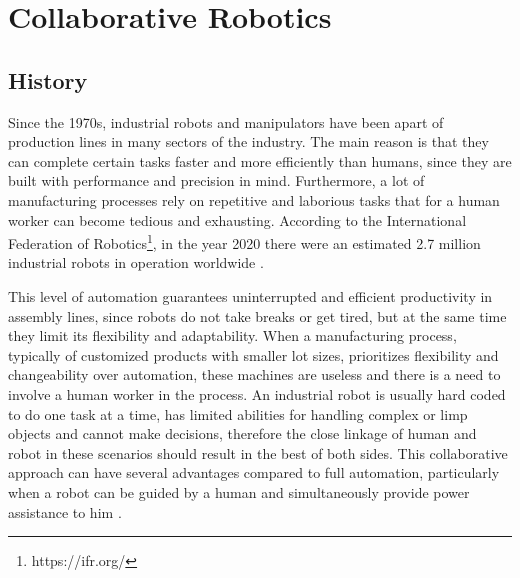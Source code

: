 \chapter{Collaborative Robotics}
\label{chapter:state-of-art}


\section{History}


\par Since the 1970s, industrial robots and manipulators have been apart of production lines in many sectors of the industry. The main reason is that they can complete certain tasks faster and more efficiently than humans, since they are built with performance and precision in mind. Furthermore, a lot of manufacturing processes rely on repetitive and laborious tasks that for a human worker can become tedious and exhausting. According to the International Federation of Robotics\footnote{https://ifr.org/}, in the year 2020 there were an estimated 2.7 million industrial robots in operation worldwide \cite{wr.report.2020}.

\par This level of automation guarantees uninterrupted and efficient productivity in assembly lines, since robots do not take breaks or get tired, but at the same time they limit its flexibility and adaptability. When a manufacturing process, typically of customized products with smaller lot sizes, prioritizes flexibility and changeability over automation, these machines are useless and there is a need to involve a human worker in the process.
% 
An industrial robot is usually hard coded to do one task at a time, has limited abilities for handling complex or limp objects and cannot make decisions, therefore the close linkage of human and robot in these scenarios should result in the best of both sides. This collaborative approach can have several advantages compared to full automation, particularly when a robot can be guided by a human and simultaneously provide power assistance to him \cite{coop.assembly}.

